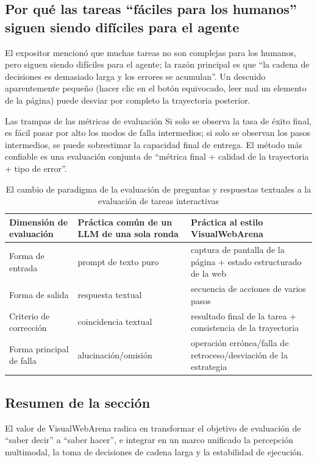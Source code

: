 \documentclass[a4paper]{article}
\begin{document}
\subsection{Por qué las tareas ``fáciles para los humanos'' siguen siendo difíciles para el agente}
El expositor mencionó que muchas tareas no son complejas para los humanos, pero siguen siendo difíciles para el agente; la razón principal es que ``la cadena de decisiones es demasiado larga y los errores se acumulan''. Un descuido aparentemente pequeño (hacer clic en el botón equivocado, leer mal un elemento de la página) puede desviar por completo la trayectoria posterior.

\begin{warningbox}{Las trampas de las métricas de evaluación}
Si solo se observa la tasa de éxito final, es fácil pasar por alto los modos de falla intermedios; si solo se observan los pasos intermedios, se puede sobrestimar la capacidad final de entrega. El método más confiable es una evaluación conjunta de ``métrica final + calidad de la trayectoria + tipo de error''.
\end{warningbox}

\begin{table}[H]
\centering
\small
\begin{tabular}{p{2.8cm}p{4.0cm}p{4.2cm}}
\toprule
\textbf{Dimensión de evaluación} & \textbf{Práctica común de un LLM de una sola ronda} & \textbf{Práctica al estilo VisualWebArena} \\
\midrule
Forma de entrada & prompt de texto puro & captura de pantalla de la página + estado estructurado de la web \\
Forma de salida & respuesta textual & secuencia de acciones de varios pasos \\
Criterio de corrección & coincidencia textual & resultado final de la tarea + consistencia de la trayectoria \\
Forma principal de falla & alucinación/omisión & operación errónea/falla de retroceso/desviación de la estrategia \\
\bottomrule
\end{tabular}
\caption{El cambio de paradigma de la evaluación de preguntas y respuestas textuales a la evaluación de tareas interactivas}
\end{table}

\subsection{Resumen de la sección}
El valor de VisualWebArena radica en transformar el objetivo de evaluación de ``saber decir'' a ``saber hacer'', e integrar en un marco unificado la percepción multimodal, la toma de decisiones de cadena larga y la estabilidad de ejecución.
\end{document}

